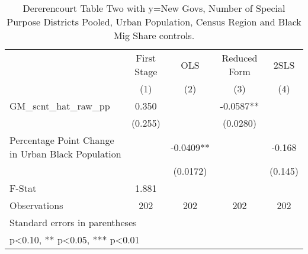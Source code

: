 \begin{table}[htbp]\centering
\def\sym#1{\ifmmode^{#1}\else\(^{#1}\)\fi}
\caption{Dererencourt Table Two with y=New Govs, Number of Special Purpose Districts Pooled, Urban Population, Census Region and Black Mig Share controls.}
\begin{tabular}{l*{4}{c}}
\toprule
                    & First Stage   &         OLS   &Reduced Form   &        2SLS   \\
                    &\multicolumn{1}{c}{(1)}   &\multicolumn{1}{c}{(2)}   &\multicolumn{1}{c}{(3)}   &\multicolumn{1}{c}{(4)}   \\
\midrule
GM\_scnt\_hat\_raw\_pp  &       0.350   &               &     -0.0587** &               \\
                    &     (0.255)   &               &    (0.0280)   &               \\
\addlinespace
Percentage Point Change in Urban Black Population&               &     -0.0409** &               &      -0.168   \\
                    &               &    (0.0172)   &               &     (0.145)   \\
\midrule
F-Stat              &       1.881   &               &               &               \\
Observations        &         202   &         202   &         202   &         202   \\
\bottomrule
\multicolumn{5}{l}{\footnotesize Standard errors in parentheses}\\
\multicolumn{5}{l}{\footnotesize * p<0.10, ** p<0.05, *** p<0.01}\\
\end{tabular}
\end{table}
